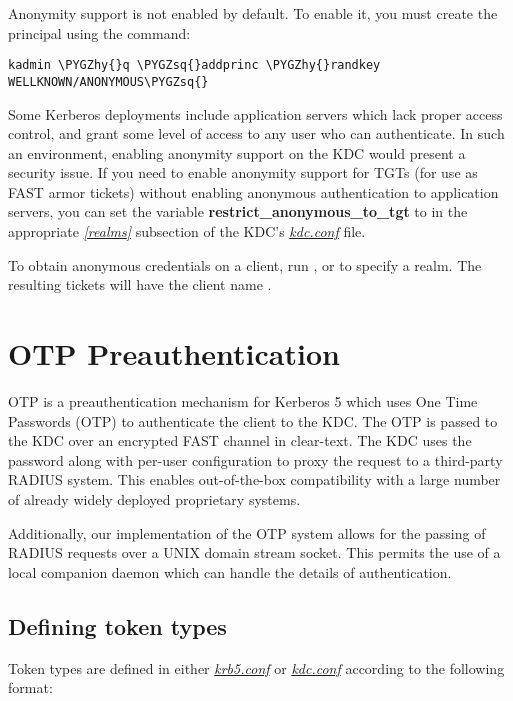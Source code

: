\documentclass[letterpaper,10pt,english]{sphinxmanual}
\def\PYGZhy{\char`\-}
\def\PYGZsq{\char`\'}
\begin{document}
Anonymity support is not enabled by default.  To enable it, you must
create the principal  using the command:

\begin{Verbatim}[commandchars=\\\{\}]
kadmin \PYGZhy{}q \PYGZsq{}addprinc \PYGZhy{}randkey WELLKNOWN/ANONYMOUS\PYGZsq{}
\end{Verbatim}

Some Kerberos deployments include application servers which lack
proper access control, and grant some level of access to any user who
can authenticate.  In such an environment, enabling anonymity support
on the KDC would present a security issue.  If you need to enable
anonymity support for TGTs (for use as FAST armor tickets) without
enabling anonymous authentication to application servers, you can set
the variable \textbf{restrict\_anonymous\_to\_tgt} to  in the
appropriate {\hyperref[admin/conf_files/kdc_conf:kdc-realms]{\emph{{[}realms{]}}}} subsection of the KDC's
{\hyperref[admin/conf_files/kdc_conf:kdc-conf-5]{\emph{kdc.conf}}} file.

To obtain anonymous credentials on a client, run , or
 to specify a realm.  The resulting tickets
will have the client name .


\chapter{OTP Preauthentication}
\label{admin/otp::doc}\label{admin/otp:otp-preauthentication}\label{admin/otp:otp-preauth}
OTP is a preauthentication mechanism for Kerberos 5 which uses One
Time Passwords (OTP) to authenticate the client to the KDC.  The OTP
is passed to the KDC over an encrypted FAST channel in clear-text.
The KDC uses the password along with per-user configuration to proxy
the request to a third-party RADIUS system.  This enables
out-of-the-box compatibility with a large number of already widely
deployed proprietary systems.

Additionally, our implementation of the OTP system allows for the
passing of RADIUS requests over a UNIX domain stream socket.  This
permits the use of a local companion daemon which can handle the
details of authentication.


\section{Defining token types}
\label{admin/otp:defining-token-types}
Token types are defined in either {\hyperref[admin/conf_files/krb5_conf:krb5-conf-5]{\emph{krb5.conf}}} or
{\hyperref[admin/conf_files/kdc_conf:kdc-conf-5]{\emph{kdc.conf}}} according to the following format:
\end{document}
